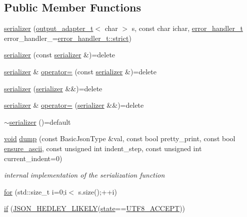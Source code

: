 \subsection*{Public Member Functions}
\begin{DoxyCompactItemize}
\item 
\hyperlink{classnlohmann_1_1detail_1_1serializer_ac010525281d97867ee842da37294fe83}{serializer} (\hyperlink{namespacenlohmann_1_1detail_a0fd8edff7729aa2dd92b070964bade2e}{output\+\_\+adapter\+\_\+t}$<$ char $>$ s, const char ichar, \hyperlink{namespacenlohmann_1_1detail_a5a76b60b26dc8c47256a996d18d967df}{error\+\_\+handler\+\_\+t} error\+\_\+handler\+\_\+=\hyperlink{namespacenlohmann_1_1detail_a5a76b60b26dc8c47256a996d18d967dfa2133fd717402a7966ee88d06f9e0b792}{error\+\_\+handler\+\_\+t\+::strict})
\item 
\hyperlink{classnlohmann_1_1detail_1_1serializer_ae3771351ec4cb892bec707edeb56dc31}{serializer} (const \hyperlink{classnlohmann_1_1detail_1_1serializer}{serializer} \&)=delete
\item 
\hyperlink{classnlohmann_1_1detail_1_1serializer}{serializer} \& \hyperlink{classnlohmann_1_1detail_1_1serializer_a5f14c33012477b9f9876dc54d97009a0}{operator=} (const \hyperlink{classnlohmann_1_1detail_1_1serializer}{serializer} \&)=delete
\item 
\hyperlink{classnlohmann_1_1detail_1_1serializer_a28081304e70cca6b3042c101ee5c498c}{serializer} (\hyperlink{classnlohmann_1_1detail_1_1serializer}{serializer} \&\&)=delete
\item 
\hyperlink{classnlohmann_1_1detail_1_1serializer}{serializer} \& \hyperlink{classnlohmann_1_1detail_1_1serializer_acaafe3436ee5fb74777eb4132a88c513}{operator=} (\hyperlink{classnlohmann_1_1detail_1_1serializer}{serializer} \&\&)=delete
\item 
\hyperlink{classnlohmann_1_1detail_1_1serializer_aa6c62b51cbebb185307df851dc0167f0}{$\sim$serializer} ()=default
\item 
\hyperlink{namespacenlohmann_1_1detail_a59fca69799f6b9e366710cb9043aa77d}{void} \hyperlink{classnlohmann_1_1detail_1_1serializer_a95460ebd1a535a543e5a0ec52e00f48b}{dump} (const Basic\+Json\+Type \&val, const bool pretty\+\_\+print, const bool \hyperlink{classnlohmann_1_1detail_1_1serializer_ab4c340f2a5230f766a833366603a0049}{ensure\+\_\+ascii}, const unsigned int indent\+\_\+step, const unsigned int current\+\_\+indent=0)
\begin{DoxyCompactList}\small\item\em internal implementation of the serialization function \end{DoxyCompactList}\item 
\hyperlink{classnlohmann_1_1detail_1_1serializer_ab14b8ec1f8102aa4c7e3c349f317654e}{for} (std\+::size\+\_\+t i=0;i$<$ s.\+size();++i)
\item 
\hyperlink{classnlohmann_1_1detail_1_1serializer_a6705bbf2de3070ec50a810a32e72309f}{if} (\hyperlink{json_8hpp_a355f2770653ff7bdd5c74b204b5a3ad0}{J\+S\+O\+N\+\_\+\+H\+E\+D\+L\+E\+Y\+\_\+\+L\+I\+K\+E\+LY}(\hyperlink{classnlohmann_1_1detail_1_1serializer_a39b0975f219b542d7ca633652e925b4c}{state}==\hyperlink{classnlohmann_1_1detail_1_1serializer_a2311a8c756c4a119aa82cd55301d13bc}{U\+T\+F8\+\_\+\+A\+C\+C\+E\+PT}))
\end{DoxyCompactItemize}
